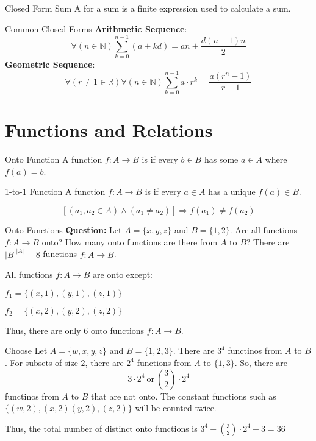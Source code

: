 \documentclass[12pt]{report}
\begin{document}
\begin{dfnbox}{Closed Form Sum}
	A  for a sum is a finite expression used to calculate a sum.
\end{dfnbox}

\begin{genbox}{Common Closed Forms}
	\textbf{Arithmetic Sequence}:
	$$\forall(n \in \mathbb{N}) \sum_{k=0}^{n-1} (a+kd) = an + \frac{d(n-1)n}{2}$$
	\textbf{Geometric Sequence}:
	$$\forall (r \neq 1 \in \mathbb{R}) \forall (n \in \mathbb{N}) \sum_{k=0}^{n-1} a \cdot r^k = \frac{a(r^n-1)}{r-1}$$

\end{genbox}

\newpage
\chapter{Functions and Relations}

\begin{dfnbox}{Onto Function}
	A function $f: A \rightarrow B$ is  if every $b \in B$ has some $a \in A$ where $f(a) = b$.
\end{dfnbox}

\begin{dfnbox}{1-to-1 Function}
	A function $f :  A \rightarrow B$ is  if every $a \in A$ has a unique $f(a) \in B$.

	$$\left[ (a_1,a_2 \in A) \land (a_1 \neq a_2) \right] \Rightarrow f(a_1) \neq f(a_2)$$
\end{dfnbox}

\begin{exbox}{Onto Functions}
	\textbf{Question:} Let $A = \{x,y,z\}$ and $B = \{1,2\}$. Are all functions $f : A \rightarrow B$ onto? How many onto functions are there from $A$ to $B$?
	\tcblower
	There are $|B|^{|A|}=8$ functions $f : A \rightarrow B$.

	All functions $f: A \rightarrow B$ are onto except:
	\begin{dfnitems}
		\item $f_1 = \{(x,1), (y,1), (z,1)\}$ 
		\item $f_2 = \{(x,2), (y,2), (z,2)\}$
	\end{dfnitems}

	Thus, there are only 6 onto functions $f : A \rightarrow B$.
\end{exbox}

\begin{exbox}{Choose}
	Let $A = \{w,x,y,z\}$ and $B=\{1,2,3\}$. There are $3^4$ functinos from $A$ to $B$. For subsets of size $2$, there are $2^4$ functions from $A$ to $\{1,3\}$. So, there are
	$$3 \cdot 2^4\ \text{or}\ {3 \choose 2} \cdot 2^4$$
	functinos from $A$ to $B$ that are not onto.
	\tcblower
	The constant functions such as $\{(w,2), (x,2) (y,2), (z,2)\}$ will be counted twice.

	Thus, the total number of distinct onto functions is $3^4 - {3 \choose 2} \cdot 2^4 + 3 = 36$
\end{exbox}
\end{document}
